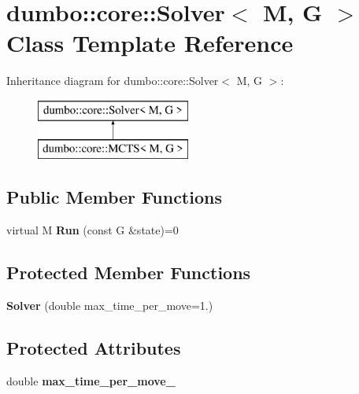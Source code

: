 \hypertarget{classdumbo_1_1core_1_1_solver}{\section{dumbo\-:\-:core\-:\-:Solver$<$ M, G $>$ Class Template Reference}
\label{classdumbo_1_1core_1_1_solver}
}
Inheritance diagram for dumbo\-:\-:core\-:\-:Solver$<$ M, G $>$\-:\begin{figure}[H]
\begin{center}
\leavevmode
\includegraphics[height=2.000000cm]{classdumbo_1_1core_1_1_solver}
\end{center}
\end{figure}
\subsection*{Public Member Functions}
\begin{DoxyCompactItemize}
\item 
\hypertarget{classdumbo_1_1core_1_1_solver_a0ed80e080e6a47d31eccb4499317b951}{virtual M {\bfseries Run} (const G \&state)=0}\label{classdumbo_1_1core_1_1_solver_a0ed80e080e6a47d31eccb4499317b951}

\end{DoxyCompactItemize}
\subsection*{Protected Member Functions}
\begin{DoxyCompactItemize}
\item 
\hypertarget{classdumbo_1_1core_1_1_solver_a72cb33718fabd620575ea83b423a8892}{{\bfseries Solver} (double max\-\_\-time\-\_\-per\-\_\-move=1.)}\label{classdumbo_1_1core_1_1_solver_a72cb33718fabd620575ea83b423a8892}

\end{DoxyCompactItemize}
\subsection*{Protected Attributes}
\begin{DoxyCompactItemize}
\item 
\hypertarget{classdumbo_1_1core_1_1_solver_a7da3faf09f70065d5f0928fe1f648cf9}{double {\bfseries max\-\_\-time\-\_\-per\-\_\-move\-\_\-}}\label{classdumbo_1_1core_1_1_solver_a7da3faf09f70065d5f0928fe1f648cf9}

\end{DoxyCompactItemize}


